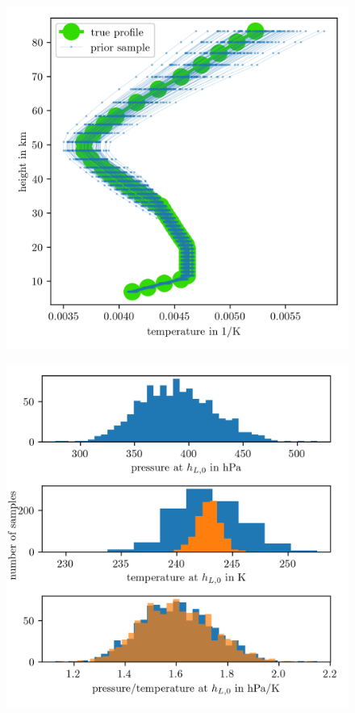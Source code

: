 \begin{figure}[ht!]
	\centering
	\includegraphics{PriorOverTempPost.png}
	\caption[]{}
	\label{fig:OverTempPrior}
\end{figure}

\begin{figure}[ht!]
	\centering
	\includegraphics{SeaLevelHist.png}
	\caption[]{}
	\label{fig:SeaLevelHist}
\end{figure}

